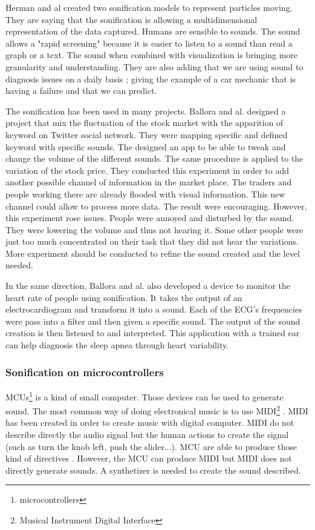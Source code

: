 Herman and al \cite{hermannListenYourData} created two sonification models to represent particles moving. They are
saying that the sonification is allowing a multidimensional representation of the data captured.
Humans are sensible to sounds. The sound allows a "rapid screening" because it is easier to listen to a sound than
read a graph or a text. The sound when combined with visualization is bringing more granularity and understanding.
They are also adding that we are using sound to diagnosis issues on a daily basis ; giving the example of a car
mechanic that is having a failure and that we can predict.

The sonification has been used in many projects. Ballora and al. \cite{ballora2012use} designed a project that mix the fluctuation of the stock
market with the apparition of keyword on Twitter social network. They were mapping specific and defined keyword with specific
sounds. The designed an app to be able to tweak and change the volume of the different sounds. The same procedure
is applied to the variation of the stock price.
They conducted this experiment in order to add another possible channel of information in the market place.
The traders and people working there are already flooded with visual information. This new channel could allow to
process more data.
The result were encouraging. However, this experiment rose issues. People were annoyed and disturbed by the sound.
They were lowering the volume and thus not hearing it. Some other people were just too much concentrated on
their task that they did not hear the variations.
More experiment should be conducted to refine the sound created and the level needed.

In the same direction, Ballora and al. \cite{ballora2012use} also developed a device to monitor the heart rate of people
using sonification. It takes the output of an electrocardiogram and transform it into a sound. Each of the ECG's frequencies
were pass into a filter and then given a specific sound.
The output of the sound creation is then listened to and interpreted. This application with a trained ear can help
diagnosis the sleep apnea through heart variability.


\subsubsection{Sonification on microcontrollers}

MCUs\footnote{microcontrollers} \cite{rochim2019design} is a kind of small computer.
Those devices can be used to generate sound. The most common way of doing electronical music
is to use MIDI\footnote{Musical Instrument Digital Interface} \cite{loyMusiciansMakeStandard1985}.
MIDI has been created in order to create music with digital computer. MIDI do not describe directly
the audio signal but the human actions to create the signal (such as turn the knob left, push the slider...).
MCU are able to produce those kind of directives \cite{fazendaProceedingsInternationalConference1}\cite{fazendaProceedingsInternationalConference2}.
However, the MCU can produce MIDI but MIDI does not directly generate sounds. A synthetizer is needed to create the sound
described.

